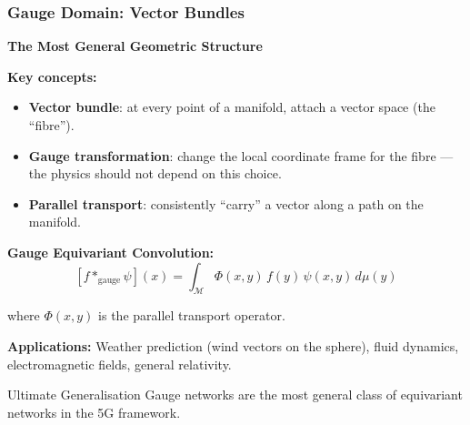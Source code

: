 \begin{frame}[fragile]\frametitle{Gauge Domain: Vector Bundles}

\begin{center}
\textbf{The Most General Geometric Structure}
\end{center}

\textbf{Key concepts:}
\begin{itemize}
\item \textbf{Vector bundle}: at every point of a manifold, attach a vector space (the ``fibre'').
\item \textbf{Gauge transformation}: change the local coordinate frame for the fibre --- the physics should not depend on this choice.
\item \textbf{Parallel transport}: consistently ``carry'' a vector along a path on the manifold.
\end{itemize}

\textbf{Gauge Equivariant Convolution:}
$$[f *_{\text{gauge}} \psi](x) = \int_{\mathcal{M}} \Phi(x,y)\, f(y)\, \psi(x,y)\, d\mu(y)$$

where $\Phi(x,y)$ is the parallel transport operator.

\textbf{Applications:} Weather prediction (wind vectors on the sphere), fluid dynamics, electromagnetic fields, general relativity.

\begin{alertblock}{Ultimate Generalisation}
Gauge networks are the most general class of equivariant networks in the 5G framework.
\end{alertblock}

\end{frame}

